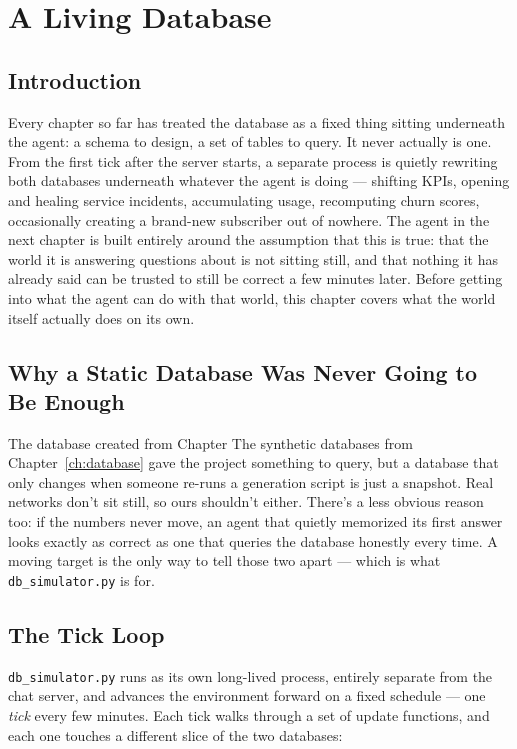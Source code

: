 \chapter{A Living Database}\label{ch:livingdb}

\section*{Introduction}

Every chapter so far has treated the database as a fixed thing sitting
underneath the agent: a schema to design, a set of tables to query. It
never actually is one. From the first tick after the server starts, a
separate process is quietly rewriting both databases underneath
whatever the agent is doing --- shifting KPIs, opening and healing
service incidents, accumulating usage, recomputing churn scores,
occasionally creating a brand-new subscriber out of nowhere. The agent
in the next chapter is built entirely around the assumption that this
is true: that the world it is answering questions about is not sitting
still, and that nothing it has already said can be trusted to still be
correct a few minutes later. Before getting into what the agent can do
with that world, this chapter covers what the world itself actually
does on its own.

\section{Why a Static Database Was Never Going to Be Enough}
The database created from Chapter 
The synthetic databases from Chapter~\ref{ch:database} gave the project
something to query, but a database that only changes when someone re-runs a
generation script is just a snapshot. Real networks don't sit still, so ours
shouldn't either. There's a less obvious reason too: if the numbers never move,
an agent that quietly memorized its first answer looks exactly as correct as one
that queries the database honestly every time. A moving target is the only way
to tell those two apart --- which is what \texttt{db\_simulator.py} is for.

\section{The Tick Loop}

\texttt{db\_simulator.py} runs as its own long-lived process, entirely
separate from the chat server, and advances the environment forward on
a fixed schedule --- one \emph{tick} every few minutes. Each tick walks
through a set of update functions, and each one touches a different
slice of the two databases:

